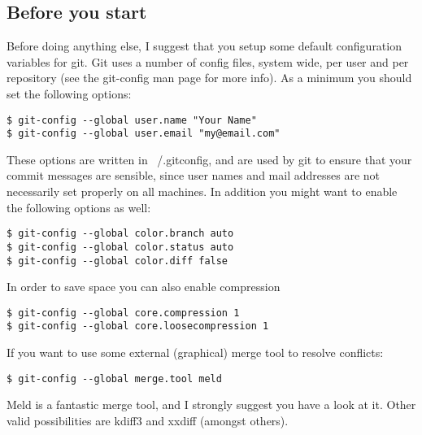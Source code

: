 \documentclass[a4paper,10pt]{article}
\begin{document}
\subsection{Before you start}
Before doing anything else, I suggest that you setup some default
configuration variables for git. Git uses a number of config files, system
wide, per user and per repository (see the git-config man page for more info).
As a minimum you should set the following options:
\begin{verbatim}
$ git-config --global user.name "Your Name"
$ git-config --global user.email "my@email.com"
\end{verbatim}
These options are written in ~/.gitconfig, and are used by git to ensure that
your commit messages are sensible, since user names and mail addresses are not
necessarily set properly on all machines. In addition you might want to enable
the following options as well:
\begin{verbatim}
$ git-config --global color.branch auto
$ git-config --global color.status auto
$ git-config --global color.diff false
\end{verbatim}
In order to save space you can also enable compression
\begin{verbatim}
$ git-config --global core.compression 1
$ git-config --global core.loosecompression 1
\end{verbatim}
If you want to use some external (graphical) merge tool to resolve conflicts:
\begin{verbatim}
$ git-config --global merge.tool meld
\end{verbatim}
Meld is a fantastic merge tool, and I strongly suggest you have a look at it.
Other valid possibilities are kdiff3 and xxdiff (amongst others).
\end{document}

